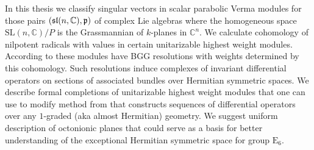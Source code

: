 \documentclass[12pt,a4paper,final]{report}
\begin{document}



\hypersetup{unicode}
\hypersetup{breaklinks=true}

\thispagestyle{empty}


In this thesis we classify singular vectors in scalar parabolic Verma modules for those pairs $(\mathfrak{sl}(n, \mathbb{C}), \mathfrak{p})$  of complex Lie algebras where the homogeneous space $\mathrm{SL}(n, \mathbb{C}) / P$ is the Grassmannian of $k$-planes in $\mathbb{C}^n.$ We calculate cohomology of nilpotent radicals with values in certain unitarizable highest weight modules. According to \cite{boe_kostant_2009} these modules have  BGG resolutions with weights determined by this cohomology. Such resolutions induce complexes of invariant differential operators on sections of associated bundles over Hermitian symmetric spaces. We describe formal completions of unitarizable highest weight modules that one can use to modify method from \cite{calderbank_differential_2001} that constructs sequences of differential operators over any $1$-graded (aka almost Hermitian) geometry. We suggest uniform description of octonionic planes that could serve as a basis for better understanding of the exceptional Hermitian symmetric space for group $\mathrm{E}_6.$
\end{document}
